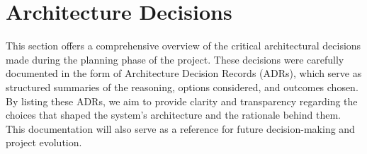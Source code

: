 \hypertarget{section-design-decisions}{%
\section{Architecture Decisions}\label{section-design-decisions}}

This section offers a comprehensive overview of the critical architectural decisions made during the planning phase of the project. These decisions were carefully documented in the form of Architecture Decision Records (ADRs), which serve as structured summaries of the reasoning, options considered, and outcomes chosen. By listing these ADRs, we aim to provide clarity and transparency regarding the choices that shaped the system's architecture and the rationale behind them. This documentation will also serve as a reference for future decision-making and project evolution.


